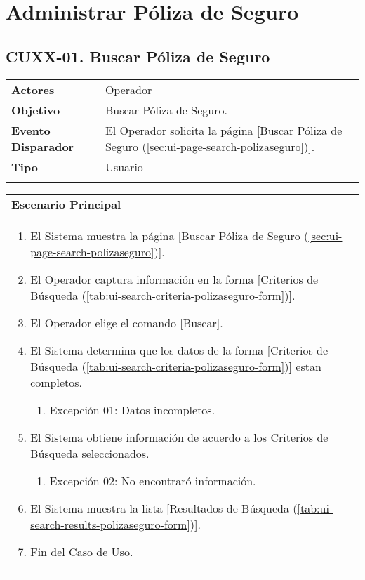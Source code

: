 \clearpage
\section{Administrar Póliza de Seguro} \label{sec:cf-uc-admin-polizaseguro}

\subsection{CUXX-01. Buscar Póliza de Seguro} \label{sec:cu-search-PolizaSeguro}

\begin{tabular}{ p{3.5cm} p{11.5cm} }
	\textbf{Actores} & Operador\\
	\textbf{Objetivo} & Buscar Póliza de Seguro.\\
	\textbf{Evento Disparador} & El Operador solicita la página [Buscar Póliza de Seguro (\ref{sec:ui-page-search-polizaseguro})].\\
	\textbf{Tipo} & Usuario\\
	\\
\end{tabular}

\begin{tabular}{ p{15.5cm} }
	\textbf{Escenario Principal} \\
	\begin{enumerate}
		\item El Sistema muestra la página [Buscar Póliza de Seguro (\ref{sec:ui-page-search-polizaseguro})].
		\item El Operador captura información en la forma [Criterios de Búsqueda (\ref{tab:ui-search-criteria-polizaseguro-form})].
		\item El Operador elige el comando [Buscar].
		\item El Sistema determina que los datos de la forma [Criterios de Búsqueda (\ref{tab:ui-search-criteria-polizaseguro-form})] estan completos.
			\begin{enumerate}
				\item Excepción 01: Datos incompletos.
			\end{enumerate}
		\item El Sistema obtiene información de acuerdo a los Criterios de Búsqueda seleccionados.
			\begin{enumerate}
				\item Excepción 02: No encontraró información.
			\end{enumerate}
		\item El Sistema muestra la lista [Resultados de Búsqueda (\ref{tab:ui-search-results-polizaseguro-form})].
		\item Fin del Caso de Uso.
	\end{enumerate}
\end{tabular}


